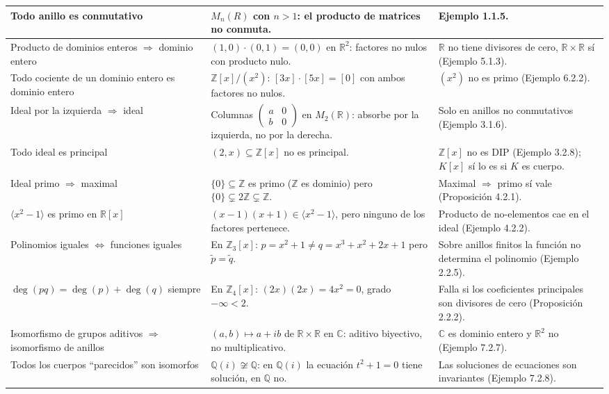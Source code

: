 \documentclass[11pt,twoside]{article}
\newcommand{\Z}{\mathbb{Z}}
\newcommand{\R}{\mathbb{R}}
\newcommand{\Q}{\mathbb{Q}}
\newcommand{\C}{\mathbb{C}}
\begin{document}
\begin{longtable}{p{} p{} p{}}
Todo anillo es conmutativo & $M_{n}(R)$ con $n > 1$: el producto de matrices no conmuta. & Ejemplo 1.1.5. \\
\hline
Producto de dominios enteros $\Rightarrow$ dominio entero & $(1,0) \cdot (0,1) = (0,0)$ en $\R^{2}$: factores no nulos con producto nulo. & $\R$ no tiene divisores de cero, $\R \times \R$ sí (Ejemplo 5.1.3). \\
\hline
Todo cociente de un dominio entero es dominio entero & $\Z[x]/(x^{2})$: $[3x] \cdot [5x] = [0]$ con ambos factores no nulos. & $(x^{2})$ no es primo (Ejemplo 6.2.2). \\
\hline
Ideal por la izquierda $\Rightarrow$ ideal & Columnas $\begin{pmatrix} a & 0 \\ b & 0 \end{pmatrix}$ en $M_{2}(\R)$: absorbe por la izquierda, no por la derecha. & Solo en anillos no conmutativos (Ejemplo 3.1.6). \\
\hline
Todo ideal es principal & $(2, x) \subseteq \Z[x]$ no es principal. & $\Z[x]$ no es DIP (Ejemplo 3.2.8); $K[x]$ sí lo es si $K$ es cuerpo. \\
\hline
Ideal primo $\Rightarrow$ maximal & $\{0\} \subseteq \Z$ es primo ($\Z$ es dominio) pero $\{0\} \subsetneq 2\Z \subsetneq \Z$. & Maximal $\Rightarrow$ primo sí vale (Proposición 4.2.1). \\
\hline
$\langle x^{2} - 1 \rangle$ es primo en $\R[x]$ & $(x-1)(x+1) \in \langle x^{2}-1 \rangle$, pero ninguno de los factores pertenece. & Producto de no-elementos cae en el ideal (Ejemplo 4.2.2). \\
\hline
Polinomios iguales $\iff$ funciones iguales & En $\Z_{3}[x]$: $p = x^{2}+1 \neq q = x^{3}+x^{2}+2x+1$ pero $\tilde{p} = \tilde{q}$. & Sobre anillos finitos la función no determina el polinomio (Ejemplo 2.2.5). \\
\hline
$\deg(pq) = \deg(p) + \deg(q)$ siempre & En $\Z_{4}[x]$: $(2x)(2x) = 4x^{2} = 0$, grado $-\infty < 2$. & Falla si los coeficientes principales son divisores de cero (Proposición 2.2.2). \\
\hline
Isomorfismo de grupos aditivos $\Rightarrow$ isomorfismo de anillos & $(a,b) \mapsto a + ib$ de $\R \times \R$ en $\C$: aditivo biyectivo, no multiplicativo. & $\C$ es dominio entero y $\R^{2}$ no (Ejemplo 7.2.7). \\
\hline
Todos los cuerpos ``parecidos'' son isomorfos & $\Q(i) \not\cong \Q$: en $\Q(i)$ la ecuación $t^{2} + 1 = 0$ tiene solución, en $\Q$ no. & Las soluciones de ecuaciones son invariantes (Ejemplo 7.2.8). \\

\end{longtable}
\end{document}

